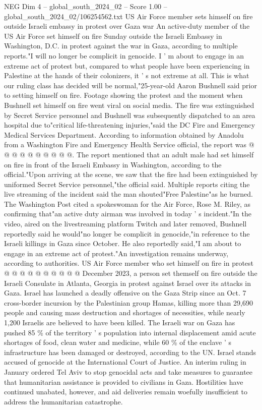 \begin{textsample}{NEG Dim 4 – global\_south\_2024\_02 – Score 1.00 – global\_south\_2024\_02/106254562.txt}  \label{ex:f4_neg_385}
US Air Force member sets himself on fire outside Israeli embassy in protest over Gaza war An active-duty member of the US Air Force set himself on fire Sunday outside the Israeli Embassy in Washington, D.C. in protest against the war in Gaza, according to multiple reports."I will no longer be complicit in genocide.
I ' m about to engage in an extreme act of protest but, compared to what people have been experiencing in Palestine at the hands of their colonizers, it ' s not extreme at all.
This is what our ruling class has decided will be normal,"25-year-old Aaron Bushnell said prior to setting himself on fire.
Footage showing the protest and the moment when Bushnell set himself on fire went viral on social media.
The fire was extinguished by Secret Service personnel and Bushnell was subsequently dispatched to an area hospital due to"critical life-threatening injuries,"said the DC Fire and Emergency Medical Services Department.
According to information obtained by Anadolu from a Washington Fire and Emergency Health Service official, the report was @ @ @ @ @ @ @ @ @ @.
The report mentioned that an adult male had set himself on fire in front of the Israeli Embassy in Washington, according to the official."Upon arriving at the scene, we saw that the fire had been extinguished by uniformed Secret Service personnel,"the official said.
Multiple reports citing the live streaming of the incident said the man shouted"Free Palestine"as he burned.
The Washington Post cited a spokeswoman for the Air Force, Rose M.
Riley, as confirming that"an active duty airman was involved in today ' s incident."In the video, aired on the livestreaming platform Twitch and later removed, Bushnell reportedly said he would"no longer be complicit in genocide,"in reference to the Israeli killings in Gaza since October.
He also reportedly said,"I am about to engage in an extreme act of protest."An investigation remains underway, according to authorities.
US Air Force member who set himself on fire in protest @ @ @ @ @ @ @ @ @ @ December 2023, a person set themself on fire outside the Israeli Consulate in Atlanta, Georgia in protest against Israel over its attacks in Gaza.
Israel has launched a deadly offensive on the Gaza Strip since an Oct. 7 cross-border incursion by the Palestinian group Hamas, killing more than 29,690 people and causing mass destruction and shortages of necessities, while nearly 1,200 Israelis are believed to have been killed.
The Israeli war on Gaza has pushed 85 \% of the territory ' s population into internal displacement amid acute shortages of food, clean water and medicine, while 60 \% of the enclave ' s infrastructure has been damaged or destroyed, according to the UN.
Israel stands accused of genocide at the International Court of Justice.
An interim ruling in January ordered Tel Aviv to stop genocidal acts and take measures to guarantee that humanitarian assistance is provided to civilians in Gaza.
Hostilities have continued unabated, however, and aid deliveries remain woefully insufficient to address the humanitarian catastrophe.

\end{textsample}
